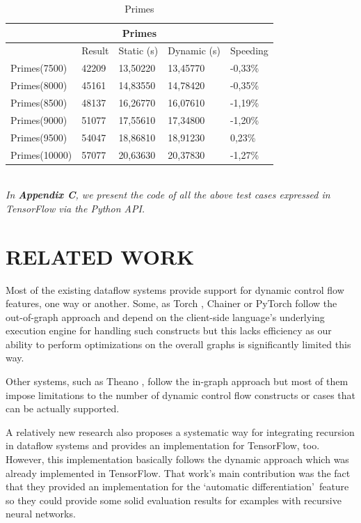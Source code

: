 \documentclass[ack,preface]{dithesis}
\begin{document}
\begin{table}[h!]
\centering
\begin{tabular}{ |p{3cm}||p{2cm}|p{3cm}|p{3cm}||p{2cm}|  }

 \hline
 \multicolumn{5}{|c|}{Primes} \\
 \hline
 	& Result &Static (s)&Dynamic (s)&Speeding\\
 \hline
 Primes(7500)   & 42209  &13,50220    & 13,45770 &   -0,33\%\\
 Primes(8000)   & 45161  &14,83550    &  14,78420  &  -0,35\%\\
 Primes(8500)   & 48137  & 16,26770   &  16,07610  &  -1,19\%\\
 Primes(9000)   & 51077  & 17,55610   & 17,34800   &  -1,20\%\\
 Primes(9500)   & 54047  & 18,86810   &  18,91230  &   0,23\%\\
 Primes(10000) & 57077  &20,63630    &  20,37830  &  -1,27\%\\
 \hline
\end{tabular}
\caption{Primes}
\label{table:1}
\end{table}

\ \\
\textit{In \textbf{Appendix C}, we present the code of all the above test cases expressed in TensorFlow via the Python API.}

\chapter{RELATED WORK}

Most of the existing dataflow systems provide support for dynamic control flow features, one way or another. 
Some, as Torch \cite{Torch}, Chainer \cite{Chainer_learningsys2015} or PyTorch \cite{Paszke2017} follow the out-of-graph approach and depend on the client-side language's underlying execution engine for handling such constructs but this lacks efficiency as our ability to perform optimizations on the overall graphs is significantly limited this way. 

Other systems, such as Theano \cite{Theano1}, follow the in-graph approach but most of them impose limitations to the number of dynamic control flow constructs or cases that can be actually supported. 

A relatively new research \cite{Jeong:2018} also proposes a systematic way for integrating recursion in dataflow systems and provides an implementation for TensorFlow, too. However, 
this implementation basically follows the dynamic approach which was already implemented in TensorFlow. That work's main contribution was the fact that they provided an implementation for the \lq automatic differentiation\rq  \ feature  so they could provide some solid evaluation results for examples with recursive neural networks.
\end{document}
